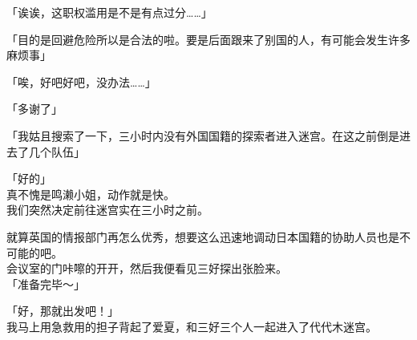 「诶诶，这职权滥用是不是有点过分……」

「目的是回避危险所以是合法的啦。要是后面跟来了别国的人，有可能会发生许多麻烦事」

「唉，好吧好吧，没办法……」

「多谢了」

「我姑且搜索了一下，三小时内没有外国国籍的探索者进入迷宫。在这之前倒是进去了几个队伍」

「好的」\\

真不愧是鸣濑小姐，动作就是快。\\

我们突然决定前往迷宫实在三小时之前。

就算英国的情报部门再怎么优秀，想要这么迅速地调动日本国籍的协助人员也是不可能的吧。\\

会议室的门咔嚓的开开，然后我便看见三好探出张脸来。\\

「准备完毕～」

「好，那就出发吧！」\\

我马上用急救用的担子背起了爱夏，和三好三个人一起进入了代代木迷宫。\\
